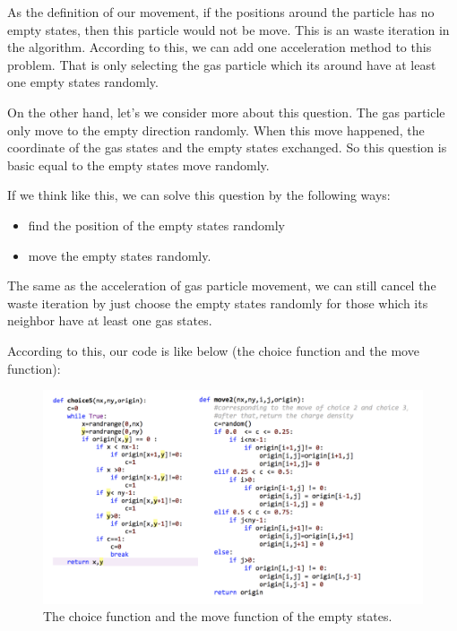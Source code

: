 \documentclass[11pt, oneside]{article}  	%
\begin{document}
As the definition of our movement, if the positions  around the particle has no empty states, then this particle would not be move. This is an waste iteration in the algorithm. According to this, we can add one acceleration method to this problem. That is only selecting the gas particle which its around have at least one empty states randomly. 

On the other hand, let's we consider more about this question. The gas particle only move to the empty direction randomly. When this move happened, the coordinate of the gas states and the empty states exchanged. So this question is basic equal to the empty states move randomly. 

If we think like this, we can solve this question by the following ways:

\begin{itemize}
\item find the position of the empty states randomly
\item move the empty states randomly.
\end{itemize}

The same as the acceleration of gas particle movement, we can still cancel the waste iteration by just choose the empty states randomly for those which its neighbor have at least one gas states. 

According to this, our code is like below (the choice function and the move function): 

\begin{figure}[htbp]
\begin{center}
\includegraphics[width=14cm]{code-3.png}
\caption{The choice function and the move function of the empty states.}
\label{choice}
\end{center}
\end{figure}
\end{document}
